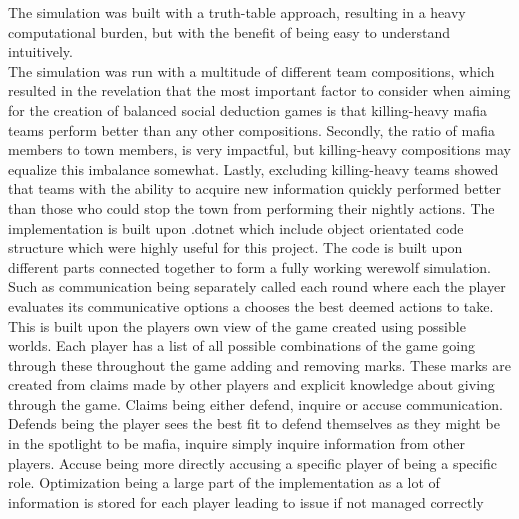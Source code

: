 The simulation was built with a truth-table approach, resulting in a heavy
computational burden, but with the benefit of being easy to understand
intuitively. \\
The simulation was run with a multitude of different team compositions, which
resulted in the revelation that the most important factor to consider when
aiming for the creation of balanced social deduction games is that killing-heavy mafia teams perform better than any other compositions. Secondly, the ratio of mafia members to town members, is very impactful, but killing-heavy compositions may equalize this imbalance somewhat. Lastly, excluding killing-heavy teams showed that teams with the ability to acquire new information quickly performed better than those who could stop the town from performing their nightly actions.
The implementation is built upon .dotnet which include object orientated code
structure which were highly useful for this project. The code is built upon
different parts connected together to form a fully working werewolf simulation.
Such as communication being separately called each round where each the player
evaluates its communicative options a chooses the best deemed actions to take.
This is built upon the players own view of the game created using possible
worlds. Each player has a list of all possible combinations of the game going
through these throughout the game adding and removing marks. These marks are
created from claims made by other players and explicit knowledge about giving
through the game. Claims being either defend, inquire or accuse communication.
Defends being the player sees the best fit to defend themselves as they might
be in the spotlight to be mafia, inquire simply inquire information from other
players. Accuse being more directly accusing a specific player of being a
specific role. Optimization being a large part of the implementation as a lot
of information is stored for each player leading to issue if not managed
correctly
\twocolumn